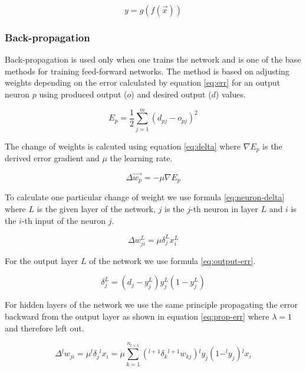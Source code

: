 \begin{equation}
    y = g( f( \vec{x} ) )
    \label{eq:output}
\end{equation}


\subsubsection{Back-propagation}
Back-propagation is used only when one trains the network and is one of the base methods for training feed-forward networks. The method is based on adjusting weights depending on the error calculated by equation \ref{eq:err} for an output neuron $ p $ using produced output ($ o $) and desired output ($ d $) values.

\begin{equation}
    E_p = \frac{1}{2} \sum_{j = 1}^{m} (d_{pj} - o_{pj})^2
    \label{eq:err}
\end{equation}

The change of weights is calcuted using equation \ref{eq:delta} where $ \nabla E_p $ is the derived error gradient and $ \mu $ the learning rate.

\begin{equation}
    \Delta \vec{w_p} = -\mu \nabla E_p
    \label{eq:delta}
\end{equation}

To calculate one particular change of weight we use formula \ref{eq:neuron-delta} where $ L $ is the given layer of the network, $ j $ is the $j$-th neuron in layer $ L $ and $ i $ is the $i$-th input of the neuron $ j $.

\begin{equation}
    \Delta w_{ji}^L = \mu \delta_j^L x_i^L
    \label{eq:neuron-delta}
\end{equation}

For the output layer $ L $ of the network we use formula \ref{eq:output-err}.

\begin{equation}
    \delta_j^L = (d_j - y_j^L) y_j^L(1 - y_j^L)
    \label{eq:output-err}
\end{equation}

For hidden layers of the network we use the same principle propagating the error backward from the output layer as shown in equation \ref{eq:prop-err} where $\lambda = 1$ and therefore left out.

\begin{equation}
    \Delta {^l w}_{ji} = \mu {^l\delta}_j {^lx}_i = \mu \sum_{k = 1}^{n_{l+1}} (^{l+1}\delta_k {^{l+1}w}_{kj}) {^ly}_j (1 - ^ly_j){^lx}_i
    \label{eq:prop-err}
\end{equation}


